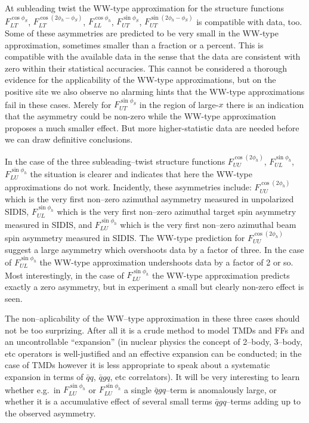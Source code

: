 \documentclass[a4paper,11pt]{article}
\begin{document}
At subleading twist the WW-type approximation for the
structure functions 
	$F_{LT}^{\cos\phi_S}$,
	$F_{LT}^{\cos(2\phi_h-\phi_S)}$,
	$F_{LL}^{\cos\phi_h}$,
	$F_{UT}^{\sin\phi_S}$,
	$F_{UT}^{\sin(2\phi_h-\phi_S)}$
is compatible with data, too. Some of these asymmetries are
predicted to be very small in the WW-type approximation,
sometimes smaller than a fraction or a percent. This is
compatible with the available data in the sense that the
data are consistent with zero within their statistical
accuracies. This cannot be considered a thorough evidence
for the applicability of the WW-type approximations, but
on the positive site we also observe no alarming hints
that the WW-type approximations fail in these cases.
Merely for $F_{UT}^{\sin\phi_S}$ in the region of large-$x$
there is an indication that the asymmetry could be 
non-zero while the WW-type approximation proposes
a much smaller effect. But more higher-statistic data 
are needed before we can draw definitive conclusions.

In the case of the three subleading--twist structure functions 
	$F_{UU}^{\cos(2\phi_h)}$, 
	$F_{UL}^{\sin\phi_h}$,
	$F_{LU}^{\sin\phi_h}$
the situation is clearer and indicates that here the WW-type
approximations do not work.
Incidently, these asymmetries include: 	$F_{UU}^{\cos(2\phi_h)}$ which 
is the very first non--zero azimuthal asymmetry measured in unpolarized SIDIS,
$F_{UL}^{\sin\phi_h}$ which is the very first non--zero azimuthal target spin 
asymmetry measured in SIDIS, and $F_{LU}^{\sin\phi_h}$ which is the 
very first non--zero azimuthal beam spin asymmetry measured in SIDIS.
The WW-type prediction for $F_{UU}^{\cos(2\phi_h)}$ suggest a large asymmetry
which overshoots data by a factor of three. In the case of $F_{UL}^{\sin\phi_h}$
the WW-type approximation undershoots data by a factor of 2 or so.
Most interestingly, in the case of $F_{LU}^{\sin\phi_h}$ the WW-type
approximation predicts exactly a zero asymmetry, but in experiment
a small but clearly non-zero effect is seen.

The non--aplicability of the WW--type approximation in these three
cases should not be too surprizing. After all it is a crude method
to model TMDs and FFs and an uncontrollable ``expansion''
(in nuclear physics the concept of 2--body, 3--body, etc operators
is well-justified and an effective expansion can be conducted; in
the case of TMDs however it is less appropriate to speak about a
systematic expansion in terms of $\bar qq$, $\bar qgq$, etc 
correlators). It will be very interesting to learn whether e.g.\ 
in $F_{LU}^{\sin\phi_h}$ or $F_{LU}^{\sin\phi_h}$ a single $\bar qgq$--term 
is anomalously large, or whether it is a accumulative effect of 
several small terms $\bar qgq$--terms adding up to the observed asymmetry.
\end{document}

